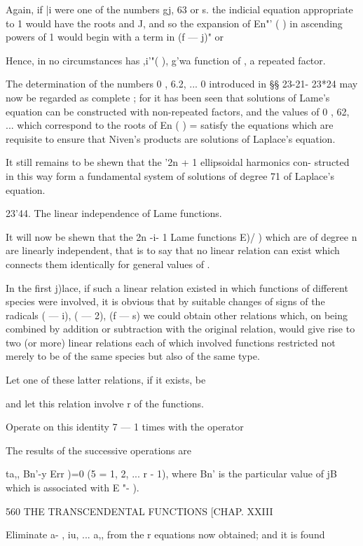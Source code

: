 {{{{{{{Again, if |i were one of the numbers gj, 63 or s. the indicial
equation appropriate to 1 would have the roots and J, and so the
expansion of En"' ( ) in ascending powers of 1 would begin with a term
in (f — j)" or

Hence, in no circumstances has ,i'"( ), g'wa function of , a repeated
factor.

The determination of the numbers 0 , 6.2, ... 0 introduced in §§
23-21- 23*24 may now be regarded as complete ; for it has been seen
that solutions of Lame's equation can be constructed with non-repeated
factors, and the values of 0 , 62, ... which correspond to the roots
of En ( ) = satisfy the equations which are requisite to ensure that
Niven's products are solutions of Laplace's equation.

It still remains to be shewn that the '2n + 1 ellipsoidal harmonics
con- structed in this way form a fundamental system of solutions of
degree 71 of Laplace's equation.

23'44. The linear independence of Lame functions.

It will now be shewn that the 2n -i- 1 Lame functions E)/ ) which are
of degree n are linearly independent, that is to say that no linear
relation can exist which connects them identically for general values
of .

In the first j)lace, if such a linear relation existed in which
functions of different species were involved, it is obvious that by
suitable changes of signs of the radicals \/( — i), \/( — 2), \/(f —
s) we could obtain other relations which, on being combined by
addition or subtraction with the original relation, would give rise to
two (or more) linear relations each of which involved functions
restricted not merely to be of the same species but also of the same
type.

Let one of these latter relations, if it exists, be

and let this relation involve r of the functions.

Operate on this identity 7 — 1 times with the operator



The results of the successive operations are

ta,, Bn'-y Err )=0 (5 = 1, 2, ... r - 1), where Bn' is the particular
value of jB which is associated with E "- ).



560 THE TRANSCENDENTAL FUNCTIONS [CHAP. XXIII

Eliminate a- , iu, ... a,, from the r equations now obtained; and it
is found

}}}}}}}
